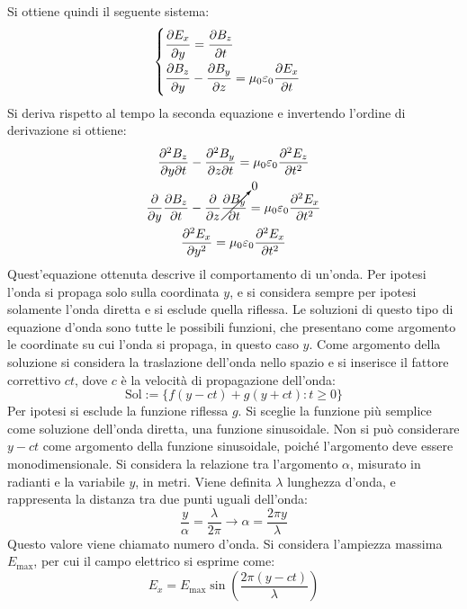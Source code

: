 \documentclass{article}
\numberwithin{equation}{subsection}
\begin{document}
Si ottiene quindi il seguente sistema:
\begin{equation*}
    \begin{cases}
        \displaystyle\frac{\strut \partial E_x}{\strut \partial y}=\frac{\strut \partial B_z}{\strut \partial t}\\
        \displaystyle\frac{\strut \partial B_z}{\strut \partial y}-\frac{\strut \partial B_y}{\strut \partial z}=\mu_0\varepsilon_0\frac{\strut \partial E_x}{\strut \partial t}
    \end{cases}
\end{equation*}
Si deriva rispetto al tempo la seconda equazione e invertendo l'ordine di derivazione si ottiene:
\begin{gather*}
    \displaystyle\frac{\partial^2B_z}{\partial y\partial t}-\frac{\partial^2B_y}{\partial z\partial t}=\mu_0\varepsilon_0\frac{\partial^2E_z}{\partial t^2}\\
    \displaystyle\frac{\partial}{\partial y}\frac{\partial B_z}{\partial t}-\frac{\partial}{\partial z}\cancelto{0}{\frac{\partial B_y}{\partial t}}=\mu_0\varepsilon_0\frac{\partial^2E_x}{\partial t^2}\\
    \displaystyle\frac{\partial^2E_x}{\partial y^2}=\mu_0\varepsilon_0\frac{\partial^2E_x}{\partial t^2}
\end{gather*}
Quest'equazione ottenuta descrive il comportamento di un'onda. Per ipotesi l'onda si propaga solo sulla coordinata $y$, e si considera sempre per ipotesi solamente l'onda 
diretta e si esclude quella riflessa. Le soluzioni di questo tipo di equazione d'onda sono tutte le possibili funzioni, che presentano come argomento le coordinate su cui 
l'onda si propaga, in questo caso $y$. Come argomento della soluzione si considera la traslazione dell'onda nello spazio e si inserisce il fattore correttivo $ct$, dove 
$c$ è la velocità di propagazione dell'onda:
\begin{equation*}
    \mathrm{Sol}:=\{f(y-ct)+g(y+ct):t\geq0\}
\end{equation*}  
Per ipotesi si esclude la funzione riflessa $g$. Si sceglie la funzione più semplice come soluzione dell'onda diretta, una funzione sinusoidale. Non si può considerare $y-ct$ 
come argomento della funzione sinusoidale, poiché l'argomento deve essere monodimensionale. Si considera la relazione tra l'argomento $\alpha$, misurato in radianti e la 
variabile $y$, in metri. Viene definita $\lambda$ lunghezza d'onda, e rappresenta la distanza tra due punti uguali dell'onda: 
\begin{equation*}
    \displaystyle\frac{y}{\alpha}=\frac{\lambda}{2\pi}\to\alpha=\frac{2\pi y}{\lambda}
\end{equation*}
Questo valore viene chiamato numero d'onda. Si considera l'ampiezza massima $E_{\max}$, per cui il campo elettrico si esprime come:
\begin{equation}
    E_x=E_{\max}\sin\left(\displaystyle\frac{2\pi (y-ct)}{\lambda}\right)
\end{equation}
\end{document}
